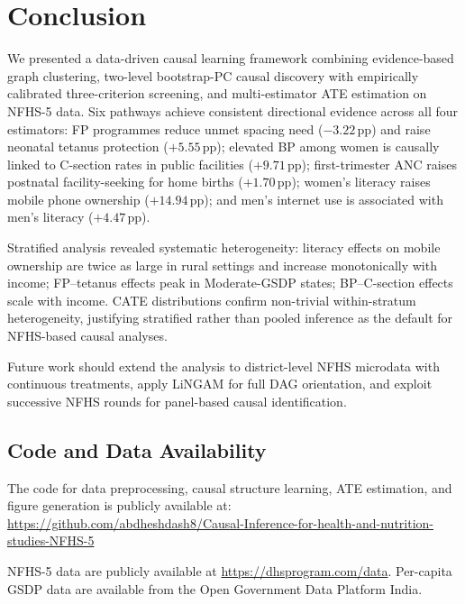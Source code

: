 \documentclass[12pt,a4paper]{report}
\begin{document}
\chapter{Conclusion}
\label{chap:conclusion}

We presented a data-driven causal learning framework combining evidence-based graph
clustering, two-level bootstrap-PC causal discovery with empirically calibrated
three-criterion screening, and multi-estimator ATE estimation on NFHS-5 data.
Six pathways achieve consistent directional evidence across all four estimators:
FP programmes reduce unmet spacing need ($-3.22$\,pp) and raise neonatal tetanus
protection ($+5.55$\,pp); elevated BP among women is causally linked to C-section
rates in public facilities ($+9.71$\,pp); first-trimester ANC raises postnatal
facility-seeking for home births ($+1.70$\,pp); women's literacy raises mobile
phone ownership ($+14.94$\,pp); and men's internet use is associated with men's
literacy ($+4.47$\,pp).

Stratified analysis revealed systematic heterogeneity: literacy effects on mobile
ownership are twice as large in rural settings and increase monotonically with
income; FP--tetanus effects peak in Moderate-GSDP states; BP--C-section effects
scale with income.
CATE distributions confirm non-trivial within-stratum heterogeneity, justifying
stratified rather than pooled inference as the default for NFHS-based causal
analyses.

Future work should extend the analysis to district-level NFHS microdata with
continuous treatments, apply LiNGAM \citep{shimizu2006linear} for full DAG
orientation, and exploit successive NFHS rounds for panel-based causal
identification.

\section*{Code and Data Availability}

The code for data preprocessing, causal structure learning, ATE estimation, and
figure generation is publicly available at:\\
\url{https://github.com/abdheshdash8/Causal-Inference-for-health-and-nutrition-studies-NFHS-5}

NFHS-5 data are publicly available at \url{https://dhsprogram.com/data}.
Per-capita GSDP data are available from the Open Government Data Platform India.
\end{document}

